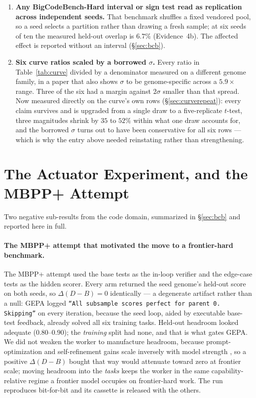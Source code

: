 \documentclass[11pt]{article}
\newcommand{\dd}{\ensuremath{\Delta}}
\begin{document}
\begin{enumerate}
    percentile-index error dropped the largest resample atom, which at $n=3$ carries
    $1/27 = 3.7\% > \alpha/2$. Corrected, the interval is $[-0.150,+0.000]$ and includes zero
    (Table~\ref{tab:ciexcl}). The error's direction flatters negative effects.
  \item \textbf{Any BigCodeBench-Hard interval or sign test read as replication across
    independent seeds.} That benchmark shuffles a fixed vendored pool, so a seed selects a
    partition rather than drawing a fresh sample; at six seeds of ten the measured held-out
    overlap is $6.7\%$ (Evidence~4b). The affected effect is reported without an interval
    (\S\ref{sec:bcb}).
  \item \textbf{Six curve ratios scaled by a borrowed $\sigma$.} Every ratio in
    Table~\ref{tab:curve} divided by a denominator measured on a different genome family, in a
    paper that also shows $\sigma$ to be genome-specific across a $5.9\times$ range. Three of the
    six had a margin against $2\sigma$ smaller than that spread. Now measured directly on the
    curve's own rows (\S\ref{sec:curverepeat}): every claim survives and is upgraded from a
    single draw to a five-replicate $t$-test, three magnitudes shrink by $35$ to $52\%$ within
    what one draw accounts for, and the borrowed $\sigma$ turns out to have been conservative for
    all six rows --- which is why the entry above needed reinstating rather than strengthening.
\end{enumerate}

\section{The Actuator Experiment, and the MBPP+ Attempt}
\label{sec:actuator}

Two negative sub-results from the code domain, summarized in \S\ref{sec:bcb} and reported
here in full.

\paragraph{The MBPP+ attempt that motivated the move to a frontier-hard benchmark.}
The MBPP+ attempt used the base tests as
the in-loop verifier and the edge-case tests as the hidden scorer. Every arm returned the
seed genome's held-out score on both seeds, so $\dd(D{-}B)=0$ identically --- a degenerate
artifact rather than a null: GEPA logged \texttt{``All subsample scores perfect for parent
0. Skipping''} on every iteration, because the seed loop, aided by executable base-test
feedback, already solved all six training tasks. Held-out headroom looked adequate
($0.80$--$0.90$); the \emph{training} split had none, and that is what gates GEPA. We did
not weaken the worker to manufacture headroom, because prompt-optimization and
self-refinement gains scale inversely with model strength
\citep{zhou2025bbopromptscale,zhang2024smallverifiers}, so a positive $\dd(D{-}B)$ bought
that way would attenuate toward zero at frontier scale; moving headroom into the
\emph{tasks} keeps the worker in the same capability-relative regime a frontier model
occupies on frontier-hard work. The run reproduces bit-for-bit and its cassette is released
with the others.
\end{document}
